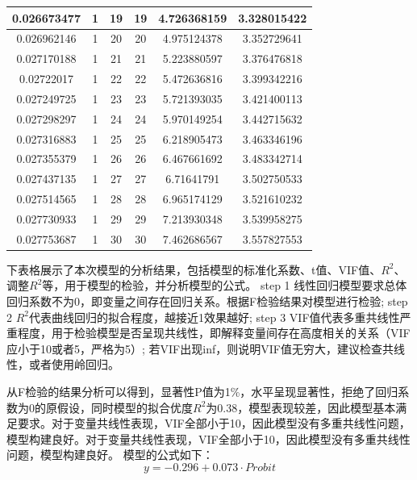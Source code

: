 \documentclass[UTF8]{ctexart}
\begin{document}
\begin{center}
\begin{longtable}{|c|c|c|c|c|c|}
		0.026673477 & 1     & 19         & 19       & 4.726368159      & 3.328015422 \\ \hline
		0.026962146 & 1     & 20         & 20       & 4.975124378      & 3.352729641 \\ \hline
		0.027170188 & 1     & 21         & 21       & 5.223880597      & 3.376476818 \\ \hline
		0.02722017  & 1     & 22         & 22       & 5.472636816      & 3.399342216 \\ \hline
		0.027249725 & 1     & 23         & 23       & 5.721393035      & 3.421400113 \\ \hline
		0.027298297 & 1     & 24         & 24       & 5.970149254      & 3.442715632 \\ \hline
		0.027316883 & 1     & 25         & 25       & 6.218905473      & 3.463346196 \\ \hline
		0.027355379 & 1     & 26         & 26       & 6.467661692      & 3.483342714 \\ \hline
		0.027437135 & 1     & 27         & 27       & 6.71641791       & 3.502750533 \\ \hline
		0.027514565 & 1     & 28         & 28       & 6.965174129      & 3.521610232 \\ \hline
		0.027730933 & 1     & 29         & 29       & 7.213930348      & 3.539958275 \\ \hline
		0.027753687 & 1     & 30         & 30       & 7.462686567      & 3.557827553 \\ \hline
\end{longtable}
\end{center}

下表格展示了本次模型的分析结果，包括模型的标准化系数、t值、VIF值、$R^2$、调整$R^2$等，用于模型的检验，并分析模型的公式。
step 1 线性回归模型要求总体回归系数不为0，即变量之间存在回归关系。根据F检验结果对模型进行检验;
step 2 $R^2$代表曲线回归的拟合程度，越接近1效果越好;
step 3 VIF值代表多重共线性严重程度，用于检验模型是否呈现共线性，即解释变量间存在高度相关的关系（VIF应小于10或者5，严格为5）;
若VIF出现inf，则说明VIF值无穷大，建议检查共线性，或者使用岭回归。

从F检验的结果分析可以得到，显著性P值为1\%，水平呈现显著性，拒绝了回归系数为0的原假设，同时模型的拟合优度$R^2$为0.38，模型表现较差，因此模型基本满足要求。对于变量共线性表现，VIF全部小于10，因此模型没有多重共线性问题，模型构建良好。对于变量共线性表现，VIF全部小于10，因此模型没有多重共线性问题，模型构建良好。
模型的公式如下：
\begin{equation}
	y=-0.296+0.073\cdot Probit
\end{equation}
\end{document}
